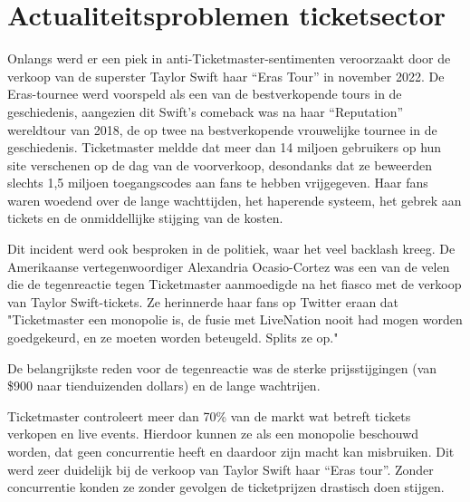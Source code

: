 
\section{Actualiteitsproblemen ticketsector}
\label{sec:Hoofdstuk_3}

Onlangs werd er een piek in anti-Ticketmaster-sentimenten veroorzaakt door de verkoop van de superster Taylor Swift haar “Eras Tour” in november 2022. 
De Eras-tournee werd voorspeld als een van de bestverkopende tours in de geschiedenis, aangezien dit Swift's comeback was na haar “Reputation” wereldtour van 2018, de op twee na bestverkopende vrouwelijke tournee in de geschiedenis.
Ticketmaster meldde dat meer dan 14 miljoen gebruikers op hun site verschenen op de dag van de voorverkoop, desondanks dat ze beweerden slechts 1,5 miljoen toegangscodes aan fans te hebben vrijgegeven. 
Haar fans waren woedend over de lange wachttijden, het haperende systeem, het gebrek aan tickets en de onmiddellijke stijging van de kosten.


Dit incident werd ook besproken in de politiek, waar het veel backlash kreeg.
De Amerikaanse vertegenwoordiger Alexandria Ocasio-Cortez was een van de velen die de tegenreactie tegen Ticketmaster aanmoedigde na het fiasco met de verkoop van Taylor Swift-tickets. Ze herinnerde haar fans op Twitter eraan dat "Ticketmaster een monopolie is, de fusie met LiveNation nooit had mogen worden goedgekeurd, en ze moeten worden beteugeld. Splits ze op."

De belangrijkste reden voor de tegenreactie was de sterke prijsstijgingen (van \$900 naar tienduizenden dollars) en de lange wachtrijen.


Ticketmaster controleert meer dan 70\% van de markt wat betreft tickets verkopen en live events.
Hierdoor kunnen ze als een monopolie beschouwd worden, dat geen concurrentie heeft en daardoor zijn macht kan misbruiken. Dit werd zeer duidelijk bij de verkoop van Taylor Swift haar “Eras tour”. Zonder concurrentie konden ze zonder gevolgen de ticketprijzen drastisch doen stijgen. 

